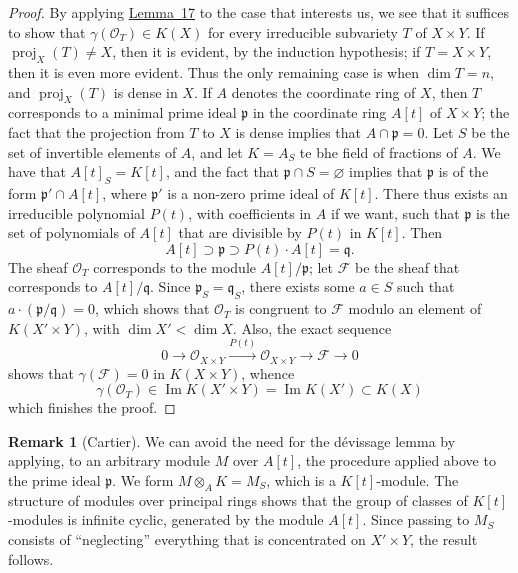 \documentclass{article}
\theoremstyle{plain}
\theoremstyle{definition}
\newtheorem*{remark}{Remark}
\newcommand{\scr}[1]{{\mathscr{#1}}}
\DeclareMathOperator{\proj}{proj}
\newcommand{\oldpage}[1]{\marginpar{\footnotesize$\Big\vert$ \textit{p.~#1}}}
\begin{document}
\begin{proof}
  By applying \hyperref[lemma17]{Lemma~17} to the case that interests us, we see that it suffices to show that $\gamma(\scr{O}_T)\in K(X)$ for every irreducible subvariety $T$ of $X\times Y$.
  If $\proj_X(T)\neq X$, then it is evident, by the induction hypothesis;
  if $T=X\times Y$, then it is even more evident.
  Thus the only remaining case is when $\dim T=n$, and $\proj_X(T)$ is dense in $X$.
  If $A$ denotes the coordinate ring of $X$, then $T$ corresponds to a minimal prime ideal $\mathfrak{p}$ in the coordinate ring $A[t]$ of $X\times Y$;
  the fact that the projection from $T$ to $X$ is dense implies that $A\cap\mathfrak{p}=0$.
  Let $S$ be the set of invertible elements of $A$, and let $K=A_S$ te bhe field of fractions of $A$.
  We have that $A[t]_S=K[t]$, and the fact that $\mathfrak{p}\cap S=\varnothing$ implies that $\mathfrak{p}$ is of the form $\mathfrak{p}'\cap A[t]$, where $\mathfrak{p}'$ is a non-zero prime ideal of $K[t]$.
  There thus exists an irreducible polynomial $P(t)$, with coefficients in $A$ if we want, such that $\mathfrak{p}$ is the set of polynomials of $A[t]$ that are divisible by $P(t)$ in $K[t]$.
  Then
  \[
    A[t] \supset \mathfrak{p} \supset P(t)\cdot A[t] = \mathfrak{q}.
  \]
  The sheaf $\scr{O}_T$ corresponds to the module $A[t]/\mathfrak{p}$;
  let $\scr{F}$ be the sheaf that corresponds to $A[t]/\mathfrak{q}$.
  Since $\mathfrak{p}_S=\mathfrak{q}_S$, there exists some $a\in S$ such that $a\cdot(\mathfrak{p}/\mathfrak{q})=0$, which shows that $\scr{O}_T$ is congruent to $\scr{F}$ modulo an element of $K(X'\times Y)$, with $\dim X'<\dim X$.
  Also, the exact sequence
  \[
    0 \to \scr{O}_{X\times Y} \xrightarrow{P(t)} \scr{O}_{X\times Y} \to \scr{F} \to 0
  \]
  shows that $\gamma(\scr{F})=0$ in $K(X\times Y)$, whence
  \[
    \gamma(\scr{O}_T) \in \operatorname{Im} K(X'\times Y) = \operatorname{Im} K(X') \subset K(X)
  \]
  which finishes the proof.
\end{proof}

\oldpage{118}
\begin{remark}[Cartier]
  We can avoid the need for the d\'{e}vissage lemma by applying, to an arbitrary module $M$ over $A[t]$, the procedure applied above to the prime ideal $\mathfrak{p}$.
  We form $M\otimes_A K=M_S$, which is a $K[t]$-module.
  The structure of modules over principal rings shows that the group of classes of $K[t]$-modules is infinite cyclic, generated by the module $A[t]$.
  Since passing to $M_S$ consists of ``neglecting'' everything that is concentrated on $X'\times Y$, the result follows.
\end{remark}
\end{document}
